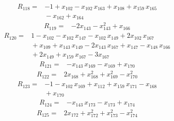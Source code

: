 \documentclass[11pt]{article}
\begin{document}
\begin{equation*}\begin{aligned}
R_{118}={}&-1 + x_{102} - x_{102}\,x_{163} + x_{108} + x_{159}\,x_{165} \\
&{} - x_{162} + x_{164}
\end{aligned}\end{equation*}
\begin{equation*}\begin{aligned}
R_{119}={}&-2x_{143} - x_{143}^{2} + x_{166}
\end{aligned}\end{equation*}
\begin{equation*}\begin{aligned}
R_{120}={}&1 - x_{102} - x_{102}\,x_{147} - x_{102}\,x_{149} + 2x_{102}\,x_{167} \\
&{} + x_{109} + x_{143}\,x_{149} - 2x_{143}\,x_{167} + x_{147} - x_{148}\,x_{166} \\
&{} + 2x_{149} + x_{159}\,x_{167} - 3x_{167}
\end{aligned}\end{equation*}
\begin{equation*}\begin{aligned}
R_{121}={}&-x_{143}\,x_{169} - x_{169} + x_{170}
\end{aligned}\end{equation*}
\begin{equation*}\begin{aligned}
R_{122}={}&2x_{168} + x_{168}^{2} + x_{169}^{2} - x_{170}^{2}
\end{aligned}\end{equation*}
\begin{equation*}\begin{aligned}
R_{123}={}&-1 - x_{102}\,x_{169} + x_{112} + x_{159}\,x_{171} - x_{168} \\
&{} + x_{170}
\end{aligned}\end{equation*}
\begin{equation*}\begin{aligned}
R_{124}={}&-x_{143}\,x_{173} - x_{173} + x_{174}
\end{aligned}\end{equation*}
\begin{equation*}\begin{aligned}
R_{125}={}&2x_{172} + x_{172}^{2} + x_{173}^{2} - x_{174}^{2}
\end{aligned}\end{equation*}
\end{document}
